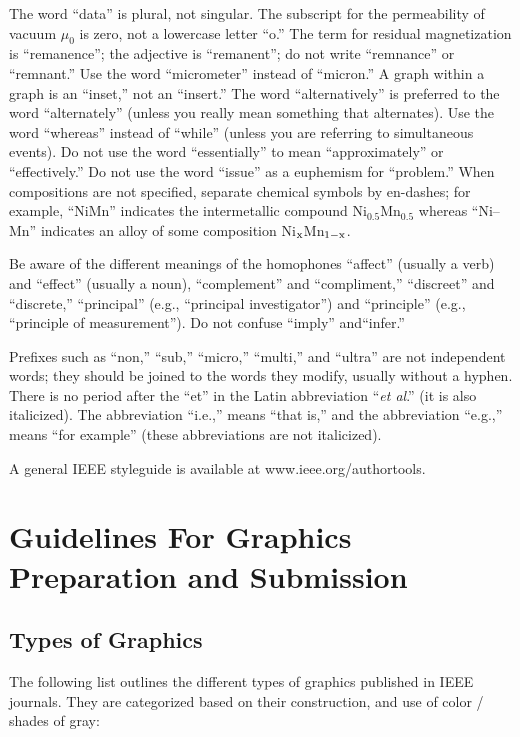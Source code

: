 \documentclass[journal]{IEEEtai}
\begin{document}
The word ``data'' is plural, not singular. The subscript for the permeability of vacuum $\mu_0$ is zero, not a lowercase letter ``o.'' The term for residual magnetization is ``remanence''; the adjective is ``remanent''; do not write ``remnance'' or ``remnant.'' Use the word ``micrometer'' instead of ``micron.'' A graph within a graph is an ``inset,'' not an ``insert.'' The word ``alternatively'' is preferred to the word ``alternately'' (unless you really mean something that alternates). Use the word ``whereas'' instead of ``while'' (unless you are referring to simultaneous events). Do not use the word ``essentially'' to mean ``approximately'' or ``effectively.'' Do not use the word ``issue'' as a euphemism for ``problem.'' When compositions are not specified, separate chemical symbols by en-dashes; for example, ``NiMn'' indicates the intermetallic compound Ni$_{0.5}$Mn$_{0.5}$ whereas ``Ni--Mn'' indicates an alloy of some composition Ni$_{\rm x}$Mn$_{1-{\rm x}}$.

Be aware of the different meanings of the homophones ``affect'' (usually a verb) and ``effect'' (usually a noun), ``complement'' and ``compliment,'' ``discreet'' and ``discrete,'' ``principal'' (e.g., ``principal investigator'') and ``principle'' (e.g., ``principle of measurement''). Do not confuse ``imply'' and\break ``infer.'' 

Prefixes such as ``non,'' ``sub,'' ``micro,'' ``multi,'' and ``ultra'' are not independent words; they should be joined to the words they modify, usually without a hyphen. There is no period after the ``et'' in the Latin abbreviation ``{\it et al}.'' (it is also italicized). The abbreviation ``i.e.,'' means ``that is,'' and the abbreviation ``e.g.,'' means ``for example'' (these abbreviations are not italicized).

A general IEEE styleguide is available at www.ieee.org/authortools.

\section{Guidelines For Graphics Preparation and Submission}

\subsection{Types of Graphics}

The following list outlines the different types of graphics published in IEEE journals. They are categorized based on their construction, and use of color / shades\vadjust{\pagebreak} of gray:
\end{document}
